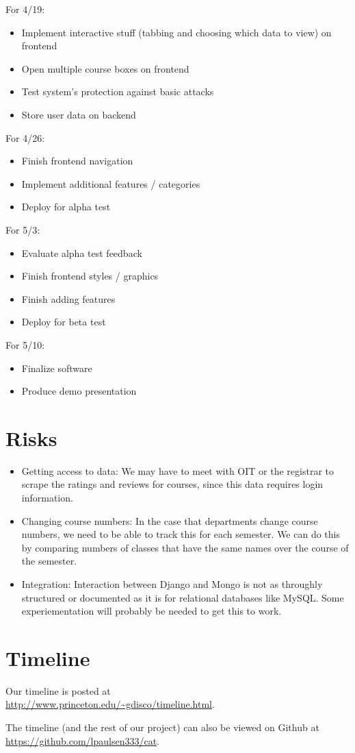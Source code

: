 \documentclass[11pt]{article}
\begin{document}
\par For 4/19:
\begin{itemize}
\item Implement interactive stuff (tabbing and choosing which data to view) on frontend
\item Open multiple course boxes on frontend
\item Test system's protection against basic attacks
\item Store user data on backend
\end{itemize}
\par For 4/26:
\begin{itemize}
\item Finish frontend navigation
\item Implement additional features / categories
\item Deploy for alpha test
\end{itemize}
\par For 5/3:
\begin{itemize}
\item Evaluate alpha test feedback
\item Finish frontend styles / graphics
\item Finish adding features
\item Deploy for beta test
\end{itemize}
\par For 5/10:
\begin{itemize}
\item Finalize software
\item Produce demo presentation
\end{itemize}

\section{Risks}
\begin{itemize}
\item Getting access to data: We may have to meet with OIT or the registrar to scrape the ratings and reviews for courses, since this data requires login information.
\item Changing course numbers: In the case that departments change course numbers, we need to be able to track this for each semester. We can do this by comparing numbers of classes that have the same names over the course of the semester.
\item Integration: Interaction between Django and Mongo is not as throughly structured or documented as it is for relational databases like MySQL. Some experiementation will probably be needed to get this to work.
\end{itemize}

\section{Timeline}
\par Our timeline is posted at \\
\url{http://www.princeton.edu/~gdisco/timeline.html}.
\par The timeline (and the rest of our project) can also be viewed on Github at \\
\url{https://github.com/lpaulsen333/cat}.
\end{document}
